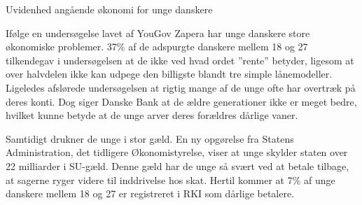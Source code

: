 Uvidenhed angående økonomi for unge danskere

Ifølge en undersøgelse lavet af YouGov Zapera \cite{DanskeB1} har unge danskere store økonomiske problemer. 37\% af de adspurgte danskere mellem 18 og 27 tilkendegav i undersøgelsen at de ikke ved hvad ordet ”rente” betyder, ligesom at over halvdelen ikke kan udpege den billigste blandt tre simple lånemodeller. Ligeledes afslørede undersøgelsen at rigtig mange af de unge ofte har overtræk på deres konti. Dog siger Danske Bank at de ældre generationer ikke er meget bedre, hvilket kunne betyde at de unge arver deres forældres dårlige vaner.  

Samtidigt drukner de unge i stor gæld. En ny opgørelse fra Statens Administration, det tidligere Økonomistyrelse, viser at unge skylder staten over 22 milliarder i SU-gæld. Denne gæld har de unge så svært ved at betale tilbage, at sagerne ryger videre til inddrivelse hos skat\cite{BusinessDK1}. Hertil kommer at 7\% af unge danskere mellem 18 og 27 er registreret i RKI som dårlige betalere\cite{BusinessDK2}.
